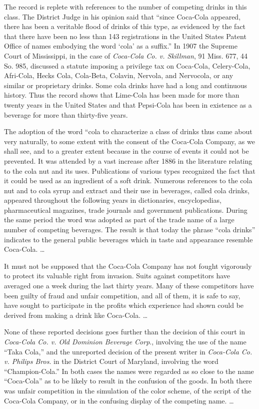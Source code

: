 The record is replete with references to the number of competing drinks in this
class. The District Judge in his opinion said that ``since Coca-Cola appeared,
there has been a veritable flood of drinks of this type, as evidenced by the
fact that there have been no less than 143 registrations in the United States
Patent Office of names embodying the word `cola' as a suffix.'' In 1907 the
Supreme Court of Mississippi, in the case of \textit{Coca-Cola Co. v.
Skillman}, 91 Miss. 677, 44 So. 985, discussed a statute imposing a privilege
tax on Coca-Cola, Celery-Cola, Afri-Cola, Hecks Cola, Cola-Beta, Colavin,
Nervola, and Nervocola, or any similar or proprietary drinks. Some cola drinks
have had a long and continuous history. Thus the record shows that Lime-Cola
has been made for more than twenty years in the United States and that
Pepsi-Cola has been in existence as a beverage for more than thirty-five years.

The adoption of the word ``cola{\textquotedbl} to characterize a class of drinks
thus came about very naturally, to some extent with the consent of the
Coca-Cola Company, as we shall see, and to a greater extent because in the
course of events it could not be prevented. It was attended by a vast increase
after 1886 in the literature relating to the cola nut and its uses.
Publications of various types recognized the fact that it could be used as an
ingredient of a soft drink. Numerous references to the cola nut and to cola
syrup and extract and their use in beverages, called cola drinks, appeared
throughout the following years in dictionaries, encyclopedias, pharmaceutical
magazines, trade journals and government publications. During the same period
the word was adopted as part of the trade name of a large number of competing
beverages. The result is that today the phrase ``cola drinks'' indicates to the
general public beverages which in taste and appearance resemble Coca-Cola.
{\dots}

It must not be supposed that the Coca-Cola Company has not fought vigorously to
protect its valuable right from invasion. Suits against competitors have
averaged one a week during the last thirty years. Many of these competitors
have been guilty of fraud and unfair competition, and all of them, it is safe
to say, have sought to participate in the profits which experience had shown
could be derived from making a drink like Coca-Cola. {\dots}

None of these reported decisions goes further than the decision of this court in
\textit{Coca-Cola Co. v. Old Dominion Beverage Corp}.,  involving the use of
the name ``Taka Cola,'' and the unreported decision of the present writer in
\textit{Coca-Cola Co. v. Philips Bros}. in the District Court of Maryland,
involving the word ``Champion-Cola.'' In both cases the names were regarded as
so close to the name ``Coca-Cola'' as to be likely to result in the confusion
of the goods. In both there was unfair competition in the simulation of the
color scheme, of the script of the Coca-Cola Company, or in the confusing
display of the competing name. {\dots}

